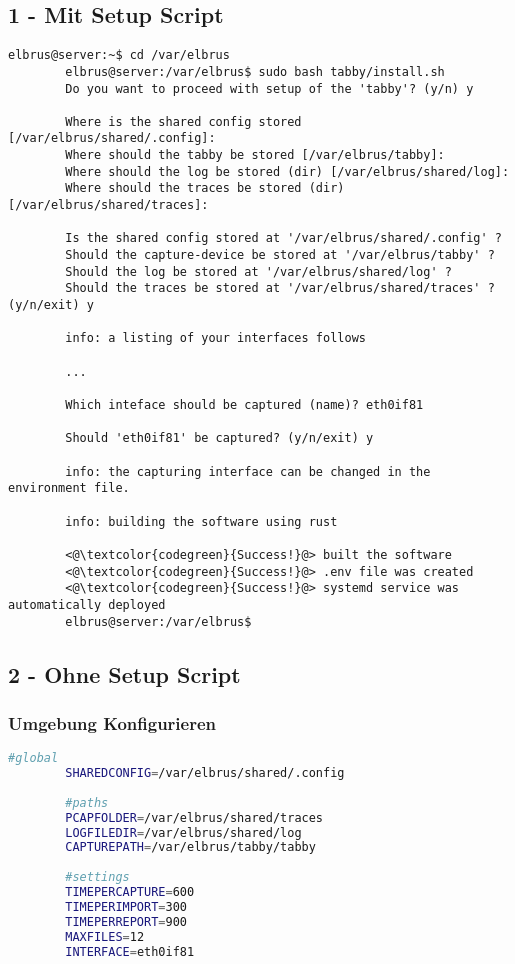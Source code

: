 	\subsection{1 - Mit Setup Script}
	
	\lstset{style=commands}
	\begin{lstlisting}[caption={Ausführen des 'install.sh' Scripts.}]
		elbrus@server:~$ cd /var/elbrus
		elbrus@server:/var/elbrus$ sudo bash tabby/install.sh
		Do you want to proceed with setup of the 'tabby'? (y/n) y
		
		Where is the shared config stored [/var/elbrus/shared/.config]:
		Where should the tabby be stored [/var/elbrus/tabby]:
		Where should the log be stored (dir) [/var/elbrus/shared/log]:
		Where should the traces be stored (dir) [/var/elbrus/shared/traces]:
		
		Is the shared config stored at '/var/elbrus/shared/.config' ?
		Should the capture-device be stored at '/var/elbrus/tabby' ?
		Should the log be stored at '/var/elbrus/shared/log' ?
		Should the traces be stored at '/var/elbrus/shared/traces' ? (y/n/exit) y
		
		info: a listing of your interfaces follows
		
		...
		
		Which inteface should be captured (name)? eth0if81
		
		Should 'eth0if81' be captured? (y/n/exit) y
		
		info: the capturing interface can be changed in the environment file.
		
		info: building the software using rust
		
		<@\textcolor{codegreen}{Success!}@> built the software
		<@\textcolor{codegreen}{Success!}@> .env file was created
		<@\textcolor{codegreen}{Success!}@> systemd service was automatically deployed
		elbrus@server:/var/elbrus$
	\end{lstlisting}
	\newpage
	
	\subsection{2 - Ohne Setup Script}
	\subsubsection[file config]{Umgebung Konfigurieren}
	\lstset{style=files}
	\begin{lstlisting}[caption={Anhand von '.env.example' eigene '.env' Datei anlegen.}, language=bash]
		#global
		SHAREDCONFIG=/var/elbrus/shared/.config
		
		#paths
		PCAPFOLDER=/var/elbrus/shared/traces
		LOGFILEDIR=/var/elbrus/shared/log
		CAPTUREPATH=/var/elbrus/tabby/tabby
		
		#settings
		TIMEPERCAPTURE=600
		TIMEPERIMPORT=300
		TIMEPERREPORT=900
		MAXFILES=12
		INTERFACE=eth0if81
	\end{lstlisting}
	
